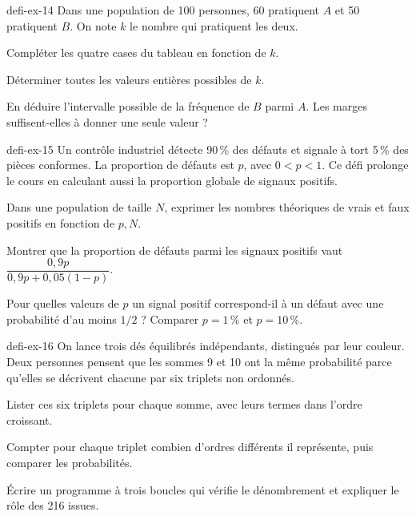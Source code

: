 \begin{blocEdition}{defi-ex-14}
Dans une population de 100 personnes, 60 pratiquent $A$ et 50 pratiquent $B$. On note $k$ le nombre qui pratiquent les deux.\begin{questions}
\item Compléter les quatre cases du tableau en fonction de $k$.
\item Déterminer toutes les valeurs entières possibles de $k$.
\item En déduire l’intervalle possible de la fréquence de $B$ parmi $A$. Les marges suffisent-elles à donner une seule valeur ?
\end{questions}
\end{blocEdition}
\begin{blocEdition}{defi-ex-15}
Un contrôle industriel détecte 90\,\% des défauts et signale à tort 5\,\% des pièces conformes. La proportion de défauts est $p$, avec $0<p<1$. Ce défi prolonge le cours en calculant aussi la proportion globale de signaux positifs.\begin{questions}
\item Dans une population de taille $N$, exprimer les nombres théoriques de vrais et faux positifs en fonction de $p,N$.
\item Montrer que la proportion de défauts parmi les signaux positifs vaut $\dfrac{0{,}9p}{0{,}9p+0{,}05(1-p)}$.
\item Pour quelles valeurs de $p$ un signal positif correspond-il à un défaut avec une probabilité d’au moins $1/2$ ? Comparer $p=1\,\%$ et $p=10\,\%$.
\end{questions}\label{fig-defi-ex-15}

\end{blocEdition}
\begin{blocEdition}{defi-ex-16}
On lance trois dés équilibrés indépendants, distingués par leur couleur. Deux personnes pensent que les sommes 9 et 10 ont la même probabilité parce qu’elles se décrivent chacune par six triplets non ordonnés.\begin{questions}
\item Lister ces six triplets pour chaque somme, avec leurs termes dans l’ordre croissant.
\item Compter pour chaque triplet combien d’ordres différents il représente, puis comparer les probabilités.
\item Écrire un programme à trois boucles qui vérifie le dénombrement et expliquer le rôle des 216 issues.
\end{questions}
\end{blocEdition}
